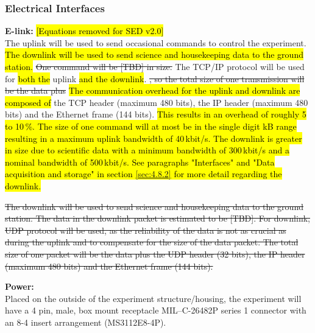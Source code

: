 \label{sec:4.2.2}


\subsubsection{Electrical Interfaces}
\label{sec:4.2.3}
\textbf{E-link:} \hl{[Equations removed for SED v2.0]}\\
The uplink will be used to send occasional commands to control the experiment. \hl{The downlink will be used to send science and housekeeping data to the ground station.} \st{One command will be [TBD] in size.} The TCP/IP protocol will be used for \hl{both the} uplink \hl{and the downlink}. \st{, so the total size of one transmission will be the data plus} \hl{The communication overhead for the uplink and downlink are composed of} the TCP header (maximum 480 bits), the IP header (maximum 480 bits) and the Ethernet frame (144 bits). \hl{This results in an overhead of roughly 5 to 10\,\%. The size of one command will at most be in the single digit kB range resulting in a maximum uplink bandwidth of 40\,kbit/s. The downlink is greater in size due to scientific data with a minimum bandwidth of 300\,kbit/s and a nominal bandwidth of 500\,kbit/s. See paragraphs "Interfaces" and "Data acquisition and storage" in section {\ref{sec:4.8.2}} for more detail regarding the downlink.}

\st{The downlink will be used to send science and housekeeping data to the ground station. The data in the downlink packet is estimated to be [TBD]. For downlink, UDP protocol will be used, as the reliability of the data is not as crucial as during the uplink and to compensate for the size of the data packet. The total size of one packet will be the data plus the UDP header (32 bits), the IP header (maximum 480 bits) and the Ethernet frame (144 bits).}

\textbf{Power:}\\

Placed on the outside of the experiment structure/housing, the experiment will have a 4 pin, male, box mount receptacle MIL–C-26482P series 1 connector with an 8-4 insert arrangement (MS3112E8-4P).



